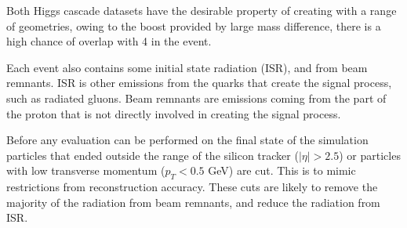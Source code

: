     Both Higgs cascade datasets have the desirable property of creating  with a range of geometries,
    owing to the boost provided by large mass difference,
    there is a high chance of overlap with 4  in the event.

    Each event also contains some initial state radiation (ISR),
    and from beam remnants.
    ISR is other emissions from the quarks that create the signal process,
    such as radiated gluons.
    Beam remnants are emissions coming from the part of the proton that is not directly involved
    in creating the signal process.



    Before any evaluation can be performed on the final state of the simulation
    particles that ended outside the range of the silicon tracker (\(|\eta|>2.5\))
    or particles with low transverse momentum (\(p_T < 0.5\) GeV) are cut.
    This is to mimic restrictions from reconstruction accuracy.
    These cuts are likely to remove the majority of the radiation from beam remnants,
    and reduce the radiation from ISR.

